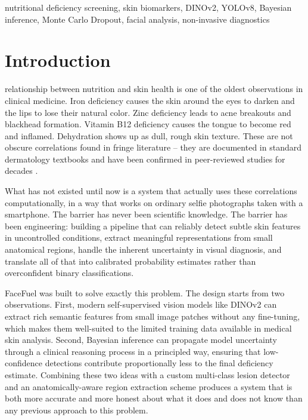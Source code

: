 \documentclass[journal]{IEEEtran}
\begin{document}
\begin{IEEEkeywords}
nutritional deficiency screening, skin biomarkers, DINOv2, YOLOv8,
Bayesian inference, Monte Carlo Dropout, facial analysis, non-invasive diagnostics
\end{IEEEkeywords}

\section{Introduction}
\label{sec:intro}

 relationship between nutrition and skin health is one of
the oldest observations in clinical medicine. Iron deficiency causes the skin
around the eyes to darken and the lips to lose their natural color.
Zinc deficiency leads to acne breakouts and blackhead formation.
Vitamin B12 deficiency causes the tongue to become red and inflamed.
Dehydration shows up as dull, rough skin texture.
These are not obscure correlations found in fringe literature --
they are documented in standard dermatology textbooks and have been confirmed
in peer-reviewed studies for decades \cite{sarkar2016,dreno2015,calder2012}.

What has not existed until now is a system that actually uses these correlations
computationally, in a way that works on ordinary selfie photographs taken with a
smartphone. The barrier has never been scientific knowledge. The barrier has been
engineering: building a pipeline that can reliably detect subtle skin features
in uncontrolled conditions, extract meaningful representations from small
anatomical regions, handle the inherent uncertainty in visual diagnosis, and
translate all of that into calibrated probability estimates rather than
overconfident binary classifications.

FaceFuel was built to solve exactly this problem. The design starts from two
observations. First, modern self-supervised vision models like DINOv2 \cite{oquab2024}
can extract rich semantic features from small image patches without any fine-tuning,
which makes them well-suited to the limited training data available in medical
skin analysis. Second, Bayesian inference can propagate model uncertainty through
a clinical reasoning process in a principled way, ensuring that low-confidence
detections contribute proportionally less to the final deficiency estimate.
Combining these two ideas with a custom multi-class lesion detector and an
anatomically-aware region extraction scheme produces a system that is both
more accurate and more honest about what it does and does not know than
any previous approach to this problem.
\end{document}
